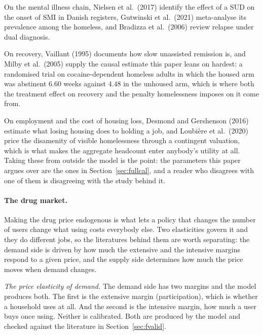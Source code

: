 \documentclass[10pt]{article}
\begin{document}
On the mental
illness chain, Nielsen et al.\ (2017) identify the effect of a SUD on the onset
of SMI in Danish registers, Gutwinski et al.\ (2021) meta-analyse its
prevalence among the homeless, and Bradizza et al.\ (2006) review relapse under dual
diagnosis.

On recovery, Vaillant (1995) documents how slow unassisted remission is,
and Milby et al.\ (2005) supply the causal estimate this paper leans on hardest: a
randomised trial on cocaine-dependent homeless adults in which the housed arm was
abstinent $6.60$ weeks against $4.48$ in the unhoused arm, which is where both the
treatment effect on recovery and the penalty homelessness imposes on it come from.

On
employment and the cost of housing loss, Desmond and Gershenson (2016) estimate what
losing housing does to holding a job, and Loubi\`ere et al.\ (2020) price the
disamenity of visible homelessness through a contingent valuation, which is what
makes the aggregate headcount enter anybody's utility at all. Taking these from
outside the model is the point: the parameters this paper argues over are the ones in
Section~\ref{sec:fullcal}, and a reader who disagrees with one of them is
disagreeing with the study behind it.

\paragraph{The drug market.} Making the drug price endogenous is what
lets a policy that changes the number of users change what using costs everybody
else. Two elasticities govern it and they do different jobs, so the literatures
behind them are worth separating: the demand side is driven by how much the extensive
and the intensive margins respond to a given price, and the supply side determines
how much the price moves when demand changes.

\emph{The price elasticity of demand.} The demand side has two margins and the
model produces both. The first is the extensive margin (participation), which is
whether a household uses at all. And the second is the intensive margin, how much a user buys once
using. Neither is
calibrated. Both are produced by the model and checked against the literature in
Section~\ref{sec:fvalid}.
\end{document}
